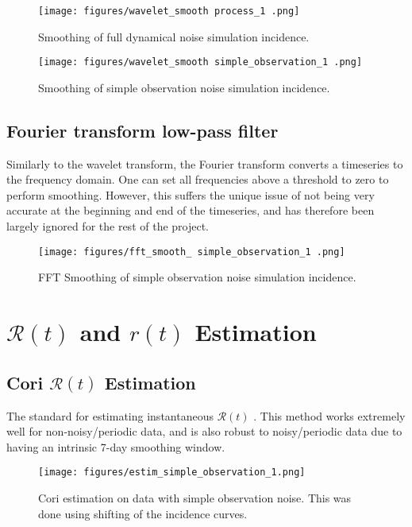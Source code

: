 \documentclass{article}
\newcommand{\nR}{\mathscr{R}}
\begin{document}
\clearpage
\begin{figure}[h!]
    \centering
    \texttt{[image: figures/wavelet\_smooth process\_1 .png]}
    \caption{Smoothing of full dynamical noise simulation incidence.}
\end{figure}

\clearpage
\begin{figure}[h!]
    \centering
    \texttt{[image: figures/wavelet\_smooth simple\_observation\_1 .png]}
    \caption{Smoothing of simple observation noise simulation incidence.}
\end{figure}



\subsection{Fourier transform low-pass filter}
Similarly to the wavelet transform, the Fourier transform converts a timeseries to the frequency domain. One can set all frequencies above a threshold to zero to perform smoothing. However, this suffers the unique issue of not being very accurate at the beginning and end of the timeseries, and has therefore been largely ignored for the rest of the project.

\clearpage
\begin{figure}[h!]
    \centering
    \texttt{[image: figures/fft\_smooth\_ simple\_observation\_1 .png]}
    \caption{FFT Smoothing of simple observation noise simulation incidence.}
\end{figure}

\section {$\nR(t)$ and $r(t)$ Estimation}
\subsection{Cori $\nR(t)$ Estimation}
The standard for estimating instantaneous $\nR(t)$ \cite{Cori}. This method works extremely well for non-noisy/periodic data, and is also robust to noisy/periodic data due to having an intrinsic 7-day smoothing window. 

\clearpage
\begin{figure}[h!]
    \centering
    \texttt{[image: figures/estim\_simple\_observation\_1.png]}
    \caption{Cori estimation on data with simple observation noise. This was done using shifting of the incidence curves.}
\end{figure}
\end{document}
